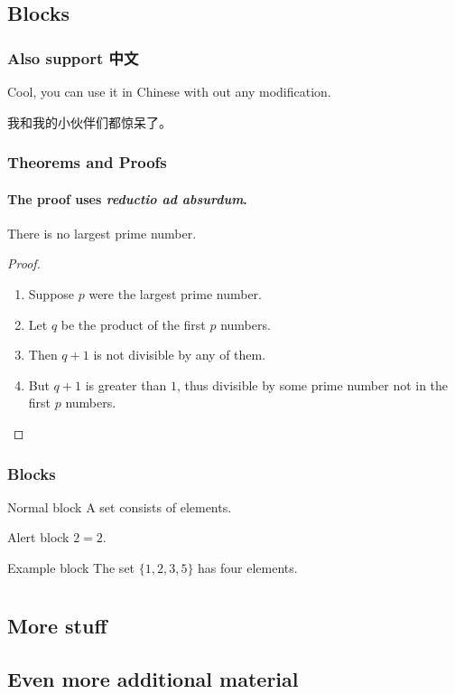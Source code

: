 \documentclass[aspectratio=169]{beamer}
\begin{document}
    \subsection{Blocks}
    \begin{frame}
        \frametitle{Also support 中文}
        Cool, you can use it in Chinese with out any modification.\par
        我和我的小伙伴们都惊呆了。
    \end{frame}
    \begin{frame}
        \frametitle{Theorems and Proofs}
        \framesubtitle{The proof uses \textit{reductio ad absurdum}.}
        \begin{theorem}
            There is no largest prime number.
        \end{theorem}
        \begin{proof}
            \begin{enumerate}
                \item<1-| alert@1> Suppose $p$ were the largest prime number.
                \item<2-> Let $q$ be the product of the first $p$ numbers.
                \item<3-> Then $q+1$ is not divisible by any of them.
                \item<1-> But $q + 1$ is greater than $1$, thus divisible by some prime
                number not in the first $p$ numbers.\qedhere
            \end{enumerate}
        \end{proof}
    \end{frame}


    \begin{frame}
        \frametitle{Blocks}

        \begin{block}{Normal block}
            A \alert{set} consists of elements.
        \end{block}

        \begin{alertblock}{Alert block}
            $2=2$.
        \end{alertblock}

        \begin{exampleblock}{Example block}
            The set $\{1,2,3,5\}$ has four elements.
        \end{exampleblock}

    \end{frame}

    \appendix

    \section{\appendixname}

    \subsection{More stuff}

    \subsection{Even more additional material}
\end{document}
